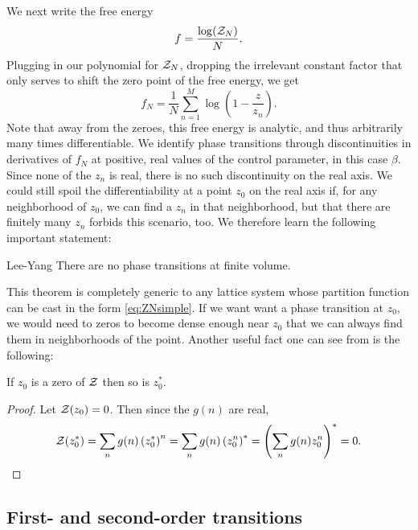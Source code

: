 We next write the free energy
\begin{equation}
f=\frac{\log(\mathcal{Z}_N)}{N}.
\end{equation}
Plugging in our polynomial for $\mathcal{Z}_N$, dropping the irrelevant constant factor
that only serves to shift the zero point of the free energy, we get
\begin{equation}
f_N=\frac{1}{N}\sum_{n=1}^M\log\left(1-\frac{z}{z_n}\right).
\end{equation}
Note that away from the zeroes, this free energy is analytic, and thus
arbitrarily many times differentiable. We identify phase transitions through
discontinuities in derivatives of $f_N$ at positive,
real values of the control parameter,
in this case $\beta$. Since none of the $z_n$ is real, there is no such
discontinuity on the real axis. We could still spoil the differentiability 
at a point $z_0$ on the real axis if, for any neighborhood of $z_0$, we
can find a $z_n$ in that neighborhood, but that there are finitely many $z_n$
forbids this scenario, too.
We therefore learn the following important statement:

\begin{theorem}{Lee-Yang}{}
There are no phase transitions at finite volume.
\end{theorem}

This theorem is completely generic to any lattice system whose partition
function can be cast in the form \eqref{eq:ZNsimple}. If we want want a phase
transition at $z_0$, we would need to zeros to become dense enough near
$z_0$ that we can always find them in neighborhoods of the point. 
Another useful fact one can see from  is the following:

\begin{theorem}{}{}
If $z_0$ is a zero of $\mathcal{Z}$ then so is $z_0^*$.
\begin{proof}
Let $\mathcal{Z}(z_0)=0$. Then since the $g(n)$ are real,
$$
\mathcal{Z}(z_0^*)
=\sum_ng(n)\left(z_0^*\right)^n
=\sum_ng(n)\left(z_0^n\right)^*
=\left(\sum_ng(n)z_0^n\right)^*
=0.
$$
\end{proof}
\end{theorem}

\subsection{First- and second-order transitions}

